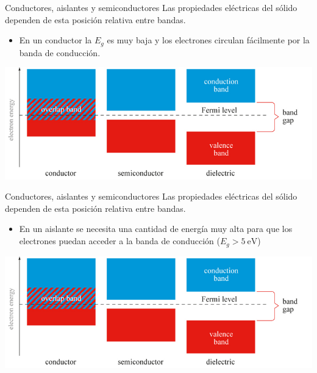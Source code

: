 \documentclass[xcolor={usenames,svgnames,dvipsnames}]{beamer}
\begin{document}
\begin{frame}[label={sec:org050dd52}]{Conductores, aislantes y semiconductores}
Las \alert{propiedades eléctricas} del sólido dependen de esta \alert{posición relativa entre bandas}.

\begin{itemize}
\item En un \alert{conductor} la \(E_{g}\) es muy baja y los electrones circulan fácilmente por la banda de conducción.
\end{itemize}

\begin{center}


\begin{center}
\includegraphics[width=.9\linewidth]{../figs/simplified_band_diagram.jpg}
\end{center}
\end{center}
\end{frame}

\begin{frame}[label={sec:orgf8002ef}]{Conductores, aislantes y semiconductores}
Las \alert{propiedades eléctricas} del sólido dependen de esta \alert{posición relativa entre bandas}.

\begin{itemize}
\item En un \alert{aislante} se necesita una cantidad de energía muy alta para que los electrones puedan acceder a la banda de conducción   (\(E_{g}>\SI{5}{\electronvolt}\))
\end{itemize}

\begin{center}


\begin{center}
\includegraphics[width=.9\linewidth]{../figs/simplified_band_diagram.jpg}
\end{center}
\end{center}
\end{frame}
\end{document}
